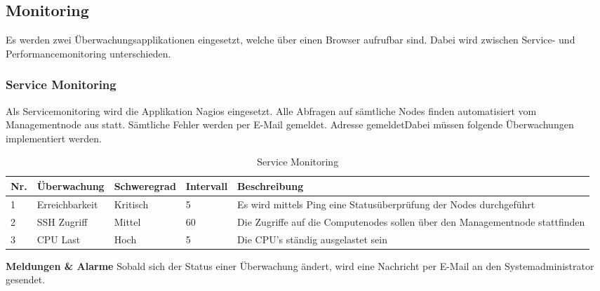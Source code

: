 \subsection{Monitoring}
Es werden zwei Überwachungsapplikationen eingesetzt, welche über einen Browser aufrufbar sind. Dabei wird zwischen Service- und Performancemonitoring unterschieden.

\subsubsection{Service Monitoring}
Als Servicemonitoring wird die Applikation Nagios eingesetzt. Alle Abfragen auf sämtliche Nodes finden automatisiert vom Managementnode aus statt. Sämtliche Fehler werden per E-Mail gemeldet. Adresse gemeldetDabei müssen folgende Überwachungen implementiert werden.

\begin{table}[H]
\begin{tabular}[t]{p{0.6cm}p{2.5cm}p{2.2cm}p{1.5cm}p{8.8cm}}
\hline
\rowcolor{heading}\textbf{Nr.} & \textbf{Überwachung} & \textbf{Schweregrad} & \textbf{Intervall} &\textbf{Beschreibung} \\\hline
1 & Erreichbarkeit & Kritisch & 5 & Es wird mittels Ping eine Statusüberprüfung der Nodes durchgeführt \\\hline
2 & SSH Zugriff & Mittel & 60 & Die Zugriffe auf die Computenodes sollen über den Managementnode stattfinden  \\\hline
3 & CPU Last & Hoch & 5 & Die CPU's ständig ausgelastet sein  \\\hline
\end{tabular}
\caption{Service Monitoring}
\end{table}

\textbf{Meldungen \& Alarme} \newline
Sobald sich der Status einer Überwachung ändert, wird eine Nachricht per E-Mail an den Systemadministrator gesendet.




